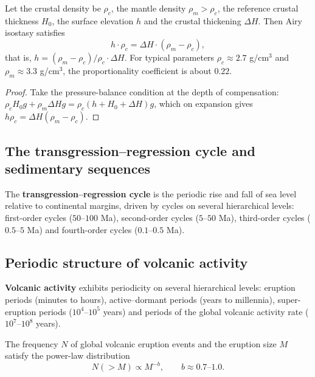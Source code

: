 \begin{proposition}\label{prop:isostasy_model}
Let the crustal density be $\rho_c$, the mantle density $\rho_m>\rho_c$, the reference crustal thickness $H_0$, the surface elevation $h$ and the crustal thickening $\Delta H$. Then Airy isostasy satisfies
\[
h\cdot\rho_c=\Delta H\cdot(\rho_m-\rho_c),
\]
that is, $h=(\rho_m-\rho_c)/\rho_c\cdot\Delta H$. For typical parameters $\rho_c\approx 2.7$ g/cm$^3$ and $\rho_m\approx 3.3$ g/cm$^3$, the proportionality coefficient is about $0.22$.
\end{proposition}

\begin{proof}
Take the pressure-balance condition at the depth of compensation: $\rho_cH_0g+\rho_m\Delta Hg=\rho_c(h+H_0+\Delta H)g$, which on expansion gives $h\rho_c=\Delta H(\rho_m-\rho_c)$.
\end{proof}

\subsection{The transgression--regression cycle and sedimentary sequences}

\begin{definition}\label{def:transgression_regression}
The \textbf{transgression--regression cycle} is the periodic rise and fall of sea level relative to continental margins, driven by cycles on several hierarchical levels: first-order cycles ($50$--$100$ Ma), second-order cycles ($5$--$50$ Ma), third-order cycles ($0.5$--$5$ Ma) and fourth-order cycles ($0.1$--$0.5$ Ma).
\end{definition}

\subsection{Periodic structure of volcanic activity}

\begin{definition}\label{def:volcanic_periodicity}
\textbf{Volcanic activity} exhibits periodicity on several hierarchical levels: eruption periods (minutes to hours), active--dormant periods (years to millennia), super-eruption periods ($10^4$--$10^5$ years) and periods of the global volcanic activity rate ($10^7$--$10^8$ years).
\end{definition}

\begin{proposition}\label{prop:volcanic_frequency}
The frequency $N$ of global volcanic eruption events and the eruption size $M$ satisfy the power-law distribution
\[
N(>M)\propto M^{-b},\qquad b\approx 0.7\text{--}1.0.
\]
\end{proposition}

